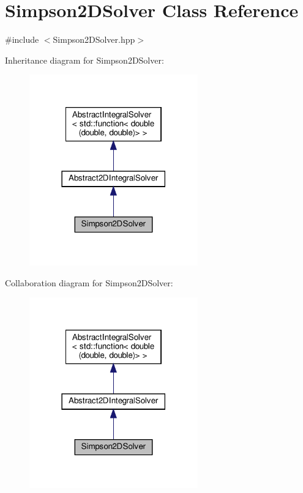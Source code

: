 \hypertarget{class_simpson2_d_solver}{}\section{Simpson2\+D\+Solver Class Reference}
\label{class_simpson2_d_solver}


{\ttfamily \#include $<$Simpson2\+D\+Solver.\+hpp$>$}



Inheritance diagram for Simpson2\+D\+Solver\+:
\nopagebreak
\begin{figure}[H]
\begin{center}
\leavevmode
\includegraphics[width=206pt]{class_simpson2_d_solver__inherit__graph}
\end{center}
\end{figure}


Collaboration diagram for Simpson2\+D\+Solver\+:
\nopagebreak
\begin{figure}[H]
\begin{center}
\leavevmode
\includegraphics[width=206pt]{class_simpson2_d_solver__coll__graph}
\end{center}
\end{figure}
